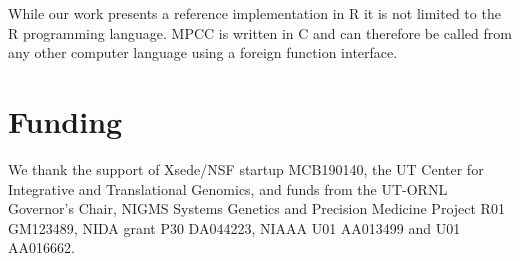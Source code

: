 \documentclass{bioinfo}
\begin{document}
While our work presents a reference implementation in R it is not
limited to the R programming language. MPCC is written in C and can
therefore be called from any other computer language using a foreign
function interface.

\section*{Funding}

We thank the support of Xsede/NSF startup MCB190140, the UT Center for
Integrative and Translational Genomics, and funds from the UT-ORNL
Governor's Chair, NIGMS Systems Genetics and Precision Medicine
Project R01 GM123489, NIDA grant P30 DA044223, NIAAA U01 AA013499 and
U01 AA016662.

\vspace*{-5mm}


\end{document}
